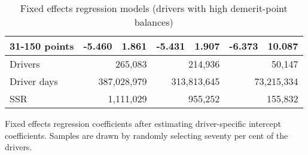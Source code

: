 \begin{table}
\begin{tabular}{l r r r r r r}
31-150 points  & -5.460  &  1.861  & -5.431  &  1.907  & -6.373  & 10.087   \\ 
 

\hline 
 

Drivers 
 & \multicolumn{2}{r}{265,083}  & \multicolumn{2}{r}{214,936}  & \multicolumn{2}{r}{50,147}   \\ 
 

Driver days 
 & \multicolumn{2}{r}{387,028,979}  & \multicolumn{2}{r}{313,813,645}  & \multicolumn{2}{r}{73,215,334}   \\ 
 

SSR 
 & \multicolumn{2}{r}{1,111,029}  & \multicolumn{2}{r}{955,252}  & \multicolumn{2}{r}{155,832}   \\ 
 

\hline 
 
\end{tabular} 
\caption{Fixed effects regression models (drivers with high demerit-point balances)} 
Fixed effects regression coefficients after estimating driver-specific intercept coefficients. 
Samples are drawn by randomly selecting seventy per cent of the drivers. 
\label{tab:FE_regs_high_pts} 
\end{table} 
 
